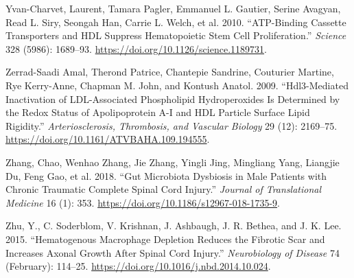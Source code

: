 \documentclass[9pt,lineno]{elife}
\newlength{\cslhangindent}
\newlength{\cslentryspacingunit} %
\newenvironment{CSLReferences}[2] %
 {%
  \setlength{\parindent}{0pt}
  \ifodd #1
  \let\oldpar\par
  \def\par{\hangindent=\cslhangindent\oldpar}
  \fi
  \setlength{\parskip}{#2\cslentryspacingunit}
 }%
 {}
\begin{document}
\begin{CSLReferences}{1}{0}
\leavevmode{}%
Yvan-Charvet, Laurent, Tamara Pagler, Emmanuel L. Gautier, Serine Avagyan, Read L. Siry, Seongah Han, Carrie L. Welch, et al. 2010. {``{ATP-Binding Cassette Transporters} and {HDL Suppress Hematopoietic Stem Cell Proliferation}.''} \emph{Science} 328 (5986): 1689--93. \url{https://doi.org/10.1126/science.1189731}.

\leavevmode{}%
Zerrad-Saadi Amal, Therond Patrice, Chantepie Sandrine, Couturier Martine, Rye Kerry-Anne, Chapman M. John, and Kontush Anatol. 2009. {``{Hdl3-Mediated Inactivation} of {LDL-Associated Phospholipid Hydroperoxides Is Determined} by the {Redox Status} of {Apolipoprotein A-I} and {HDL Particle Surface Lipid Rigidity}.''} \emph{Arteriosclerosis, Thrombosis, and Vascular Biology} 29 (12): 2169--75. \url{https://doi.org/10.1161/ATVBAHA.109.194555}.

\leavevmode{}%
Zhang, Chao, Wenhao Zhang, Jie Zhang, Yingli Jing, Mingliang Yang, Liangjie Du, Feng Gao, et al. 2018. {``Gut Microbiota Dysbiosis in Male Patients with Chronic Traumatic Complete Spinal Cord Injury.''} \emph{Journal of Translational Medicine} 16 (1): 353. \url{https://doi.org/10.1186/s12967-018-1735-9}.

\leavevmode{}%
Zhu, Y., C. Soderblom, V. Krishnan, J. Ashbaugh, J. R. Bethea, and J. K. Lee. 2015. {``Hematogenous Macrophage Depletion Reduces the Fibrotic Scar and Increases Axonal Growth After Spinal Cord Injury.''} \emph{Neurobiology of Disease} 74 (February): 114--25. \url{https://doi.org/10.1016/j.nbd.2014.10.024}.

\end{CSLReferences}
\end{document}
